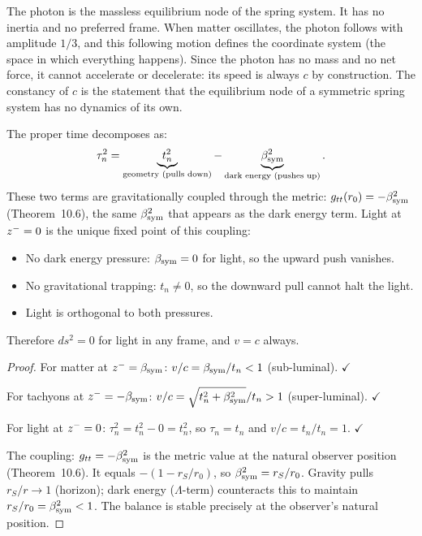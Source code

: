 \begin{remark}
The photon is the massless equilibrium node of the spring system.
It has no inertia and no preferred frame.
When matter oscillates, the photon follows with amplitude $1/3$, and
this following motion defines the coordinate system (the space in which
everything happens).
Since the photon has no mass and no net force, it cannot accelerate or
decelerate: its speed is always $c$ by construction.
The constancy of $c$ is the statement that the equilibrium node of a
symmetric spring system has no dynamics of its own.
\end{remark}

\begin{theorem}
\label{thm:light-equil}
The proper time decomposes as:
\[
 \tau_n^2
 = \underbrace{t_n^2}_{\text{geometry (pulls down)}}
 - \underbrace{\beta_{\mathrm{sym}}^2}_{\text{dark energy (pushes up)}}.
\]
These two terms are gravitationally coupled through the metric:
$g_{tt}(r_0)=-\beta_{\mathrm{sym}}^2$ (Theorem~10.6), the same $\beta_{\mathrm{sym}}^2$
that appears as the dark energy term.
Light at $z^-=0$ is the unique fixed point of this coupling:
\begin{itemize}
 \item No dark energy pressure: $\beta_{\mathrm{sym}}=0$ for light, so the upward
 push vanishes.
 \item No gravitational trapping: $t_n\neq 0$, so the downward pull
 cannot halt the light.
 \item Light is orthogonal to both pressures.
\end{itemize}
Therefore $ds^2=0$ for light in any frame, and $v=c$ always.
\begin{proof}
For matter at $z^-=\beta_{\mathrm{sym}}$: $v/c=\beta_{\mathrm{sym}}/t_n<1$ (sub-luminal). $\checkmark$

For tachyons at $z^-=-\beta_{\mathrm{sym}}$:
$v/c=\sqrt{t_n^2+\beta_{\mathrm{sym}}^2}/t_n>1$ (super-luminal). $\checkmark$

For light at $z^-=0$:
$\tau_n^2=t_n^2-0=t_n^2$, so $\tau_n=t_n$ and $v/c=t_n/t_n=1$.
$\checkmark$

The coupling: $g_{tt}=-\beta_{\mathrm{sym}}^2$ is the metric value at the natural
observer position (Theorem~10.6).
It equals $-(1-r_S/r_0)$, so $\beta_{\mathrm{sym}}^2=r_S/r_0$.
Gravity pulls $r_S/r\to 1$ (horizon); dark energy ($\Lambda$-term)
counteracts this to maintain $r_S/r_0=\beta_{\mathrm{sym}}^2<1$.
The balance is stable precisely at the observer's natural position.
\end{proof}
\end{theorem}

